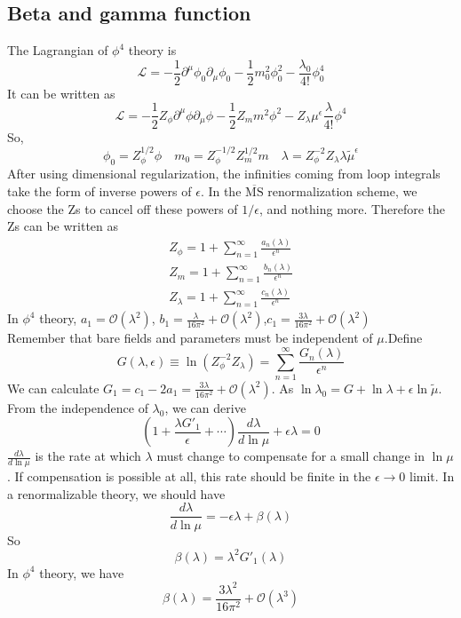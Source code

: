 \subsection{Beta and gamma function}
\noindent
The Lagrangian of $\phi^4$ theory is 
\[\mathcal{L} = -\frac{1}{2} \partial^{\mu} \phi_0 \partial_{\mu} \phi_0 -\frac{1}{2}m_0^2 \phi_0^2 - \frac{\lambda_0}{4!}\phi_0^4\]
It can be written as
\[\mathcal{L} = -\frac{1}{2}Z_{\phi} \partial^{\mu} \phi \partial_{\mu} \phi -\frac{1}{2}Z_{m}m^2 \phi^2 - Z_{\lambda} \mu^{\epsilon}\frac{\lambda}{4!}\phi^4\]
So, 
\[\phi_0 = Z_{\phi}^{1/2}\phi \quad m_0 = Z_{\phi}^{-1/2} Z_{m}^{1/2}m \quad \lambda = Z_{\phi}^{-2} Z_{\lambda} \lambda \tilde{\mu}^{\epsilon}\]
After using dimensional regularization, the infinities coming from loop integrals take the form of inverse powers of $\epsilon$. In the  $\mathrm{\overline{MS}}$ renormalization scheme, we choose the Zs to cancel off these powers of $1/\epsilon$, and nothing more. Therefore the Zs can be written as
\begin{eqnarray}
Z_{\phi} = 1 + \sum_{n=1}^{\infty} \frac{a_n(\lambda)}{\epsilon^n} \nonumber \\
Z_{m} = 1 + \sum_{n=1}^{\infty} \frac{b_n(\lambda)}{\epsilon^n} \nonumber \\
Z_{\lambda} = 1 + \sum_{n=1}^{\infty} \frac{c_n(\lambda)}{\epsilon^n} \nonumber 
\end{eqnarray}
In $\phi^4$ theory, $a_1 = \mathcal{O}(\lambda^2)$, $b_1 = \frac{\lambda}{16\pi^2} +  \mathcal{O}(\lambda^2)$,$c_1 = \frac{3\lambda}{16\pi^2} + \mathcal{O}(\lambda^2)$\\
Remember that bare fields and parameters must be independent of $\mu$.Define
\[G(\lambda,\epsilon) \equiv \ln(Z_{\phi}^{-2} Z_{\lambda}) = \sum_{n=1}^{\infty} \frac{G_n(\lambda)}{\epsilon^n}\]
We can calculate $G_1 = c_1 - 2a_1 = \frac{3\lambda}{16\pi^2} + \mathcal{O}(\lambda^2)$.
As $\ln \lambda_0 = G + \ln \lambda + \epsilon \ln \tilde{\mu} $. From the independence of $\lambda_0$, we can derive
\[\left ( 1 + \frac{\lambda G'_1}{\epsilon} + \cdots \right) \frac{d\lambda}{d\ln \mu} + \epsilon \lambda = 0\]
$\frac{d\lambda}{d\ln\mu}$ is the rate at which $\lambda$ must change to compensate for a small change in $\ln \mu$. If compensation is possible at all, this rate should be finite in the $\epsilon \to 0$ limit. In a renormalizable theory, we should have
\[\frac{d\lambda}{d\ln\mu} = -\epsilon\lambda + \beta(\lambda)\]
So
\[\beta(\lambda) = \lambda^2 G'_1(\lambda)\]
In $\phi^4$ theory, we have
\[\beta(\lambda) = \frac{3\lambda^2}{16\pi^2} + \mathcal{O}(\lambda^3)\]
